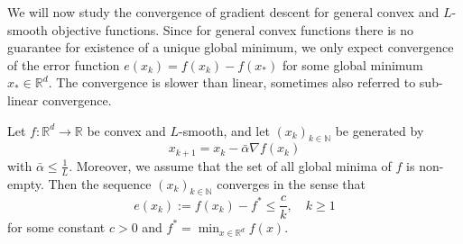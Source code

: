 \documentclass[12pt,openany]{book}
\theoremstyle{definition}
\theoremstyle{definition}
\newcommand{\N}{\mathbb{N}}
\newcommand{\R}{\mathbb{R}}
\begin{document}
We will now study the convergence of gradient descent for general convex and $L$-smooth objective functions.  Since for general convex functions there is no guarantee for existence of a unique global minimum, we only expect convergence of the error function $e(x_k) = f(x_k)-f(x_\ast)$ for some global minimum $x_\ast\in\R^d$. The convergence is slower than linear, sometimes also referred to sub-linear convergence. 
\begin{thm}\label{thm:GD_convex}
Let $f:\R^d\to\R$ be convex and $L$-smooth, and let $(x_k)_{k\in\N}$ be generated by 
\[x_{k+1} = x_k - \bar\alpha \nabla f(x_k) \]
with 
$\bar\alpha\le \frac{1}{L}$. Moreover, we assume that the set of all global minima of $f$ is non-empty. Then the sequence $(x_k)_{k\in\N}$ converges in the sense that
\[e(x_k):=f(x_k)-f^\ast \le \frac{c}{k},\quad k\ge 1\]
for some constant $c>0$ and $f^\ast = \min_{x\in\R^d} f(x)$. 
\end{thm}
\end{document}

